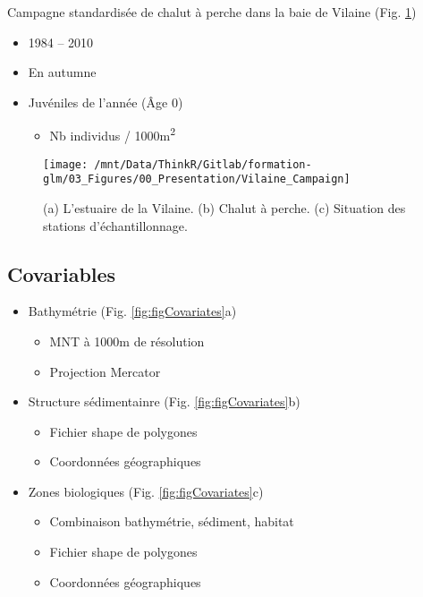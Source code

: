 \documentclass[french,a4paper]{article}
\providecommand{\tightlist}{%
  \setlength{\itemsep}{0pt}\setlength{\parskip}{0pt}}
\begin{document}
Campagne standardisée de chalut à perche dans la baie de Vilaine (Fig.
\ref{fig:figVilaineCampaign})

\begin{itemize}
\tightlist
\item
  1984 -- 2010
\item
  En autumne
\item
  Juvéniles de l'année (Âge 0)

  \begin{itemize}
  \tightlist
  \item
    Nb individus / 1000m\textsuperscript{2}
  \end{itemize}
\end{itemize}




\begin{figure}[!h]

{\centering \texttt{[image: /mnt/Data/ThinkR/Gitlab/formation-glm/03\_Figures/00\_Presentation/Vilaine\_Campaign]} 

}

\caption{(a) L'estuaire de la Vilaine. (b) Chalut à
perche. (c) Situation des stations d'échantillonnage.}\label{fig:figVilaineCampaign}
\end{figure}

\subsection{Covariables}\label{covariables}

\begin{itemize}
\tightlist
\item
  Bathymétrie (Fig. \ref{fig:figCovariates}a)

  \begin{itemize}
  \tightlist
  \item
    MNT à 1000m de résolution
  \item
    Projection Mercator
  \end{itemize}
\item
  Structure sédimentainre (Fig. \ref{fig:figCovariates}b)

  \begin{itemize}
  \tightlist
  \item
    Fichier shape de polygones
  \item
    Coordonnées géographiques
  \end{itemize}
\item
  Zones biologiques (Fig. \ref{fig:figCovariates}c)

  \begin{itemize}
  \tightlist
  \item
    Combinaison bathymétrie, sédiment, habitat
  \item
    Fichier shape de polygones
  \item
    Coordonnées géographiques
  \end{itemize}
\end{itemize}
\end{document}
